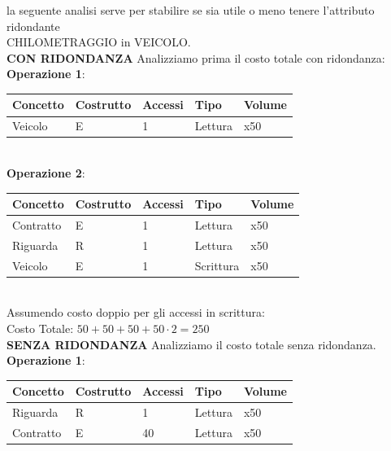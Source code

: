 \documentclass[10pt,a4paper]{article}
\begin{document}
\noindent
la seguente analisi serve per stabilire se sia utile o meno tenere l’attributo ridondante \\CHILOMETRAGGIO in VEICOLO.\\
\noindent
\textbf{CON RIDONDANZA} Analizziamo prima il costo totale con ridondanza:\\
\textbf{Operazione 1}:\\
\begin{table} [h!]
\centering
\begin{tabular}{|p{2cm}|p{2cm}|p{2cm}|p{2cm}|p{1.5cm}|}
\hline
\textbf{Concetto} & \textbf{Costrutto} & \textbf{Accessi} & \textbf{Tipo} & \textbf{Volume} \\
\hline
Veicolo & E & 1 & Lettura & x50 \\
\hline
\end{tabular}
\end{table}
\\
\textbf{Operazione 2}:\\
\begin{table} [h!]
\centering
\begin{tabular}{|p{2cm}|p{2cm}|p{2cm}|p{2cm}|p{1.5cm}|}
\hline
\textbf{Concetto} & \textbf{Costrutto} & \textbf{Accessi} & \textbf{Tipo} & \textbf{Volume} \\
\hline
Contratto & E & 1 & Lettura & x50 \\
\hline
Riguarda & R & 1 & Lettura & x50 \\
\hline
Veicolo & E & 1 & Scrittura & x50 \\
\hline
\end{tabular}
\end{table}
\\

\noindent
Assumendo costo doppio per gli accessi in scrittura:\\
Costo Totale: $50 + 50 + 50 + 50\cdot2 = 250$
\\

\noindent
\textbf{SENZA RIDONDANZA} Analizziamo il costo totale senza ridondanza.\\

\noindent
\textbf{Operazione 1}:
\begin{table} [h!]
\centering
\begin{tabular}{|p{2cm}|p{2cm}|p{2cm}|p{2cm}|p{1.5cm}|}
\hline
\textbf{Concetto} & \textbf{Costrutto} & \textbf{Accessi} & \textbf{Tipo} & \textbf{Volume} \\
\hline
Riguarda & R & 1 & Lettura & x50 \\
\hline
Contratto & E & 40 & Lettura & x50 \\
\hline
\end{tabular}
\end{table}
\end{document}

